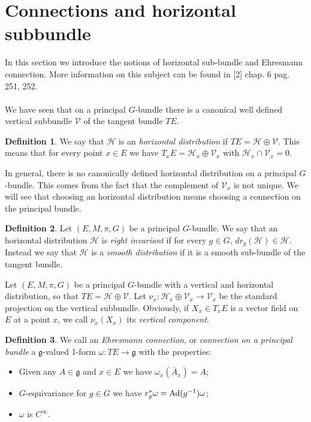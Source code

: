 \documentclass[12pt,a4paper]{report}
\theoremstyle{definition}
\newtheorem{Def}{Definition}[chapter]
\theoremstyle{Theorem}
\theoremstyle{definition}
\theoremstyle{definition}
\begin{document}
	\section{Connections and horizontal subbundle}
	In this section we introduce the notions of horizontal sub-bundle and Ehresmann connection. More information on this subject can be found in [2] chap. 6 pag. 251, 252.\\
	\\
	We have seen that on a principal $G$-bundle there is a canonical well defined vertical subbundle $\mathcal{V}$ of the tangent bundle $TE$. 
	\begin{Def}
		We say that $\mathcal{H}$ is an \textit{horizontal distribution} if $TE=\mathcal{H}\oplus\mathcal{V}$. This means that for every point $x\in E$ we have $T_{x}E=\mathcal{H}_{x}\oplus\mathcal{V}_{x}$ with $\mathcal{H}_{x}\cap\mathcal{V}_{x}=0$.
	\end{Def}
	In general, there is no canonically defined horizontal distribution on a principal $G$-bundle. This comes from the fact that the complement of $\mathcal{V}_x$ is not unique. We will see that choosing an horizontal distribution means choosing a connection on the principal bundle. 
	\begin{Def}
		Let $(E,M,\pi,G)$ be a principal $G$-bundle. We say that an horizontal distribution $\mathcal{H}$ is \textit{right invariant} if for every $g\in G$, $dr_g(\mathcal{H})\in \mathcal{H}$.
		Instead we say that $\mathcal{H}$ is a \textit{smooth distribution} if it is a smooth sub-bundle of the tangent bundle.
	\end{Def}
	Let $(E,M,\pi,G)$ be a principal $G$-bundle with a vertical and horizontal distribution, so that $TE=\mathcal{H}\oplus\mathcal{V}$. Let $\nu_{x}:\mathcal{H}_{x}\oplus\mathcal{V}_{x}\rightarrow \mathcal{V}_{x}$ be the standard projection on the vertical subbundle. Obviously, if $X_{x}\in T_{x}E$ is a vector field on $E$ at a point $x$, we call $\nu_{x}(X_{x})$ its \textit{vertical component}.
	\begin{Def}\label{Def_6.6}
		We call an \textit{Ehresmann connection}, or \textit{connection on a principal bundle} a $\mathfrak{g}$-valued 1-form $\omega:TE\rightarrow \mathfrak{g}$ with the properties:
		\begin{itemize}
			\item Given any $A\in\mathfrak{g}$ and $x\in E$ we have $\omega_{x}(\bar{A}_{x})=A$;
			\item $G$-equivariance for $g\in G$ we have $r^*_g\omega=\hbox{Ad}(g^{-1})\omega$;
			\item $\omega$ is $C^\infty$.
		\end{itemize}
	\end{Def}
\end{document}
